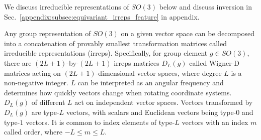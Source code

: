 We discuss irreducible representations of $SO(3)$ below and discuss inversion in Sec.~\ref{appendix:subsec:equivariant_irreps_feature} in appendix.


Any group representation of $SO(3)$ on a given vector space can be decomposed into a concatenation of provably smallest transformation matrices called irreducible representations (irreps).
Specifically, for group element $g \in SO(3)$, there are $(2L+1)$-by-$(2L+1)$ irreps matrices $D_{L}(g)$ called Wigner-D matrices acting on $(2L+1)$-dimensional vector spaces, where degree $L$ is a non-negative integer.
$L$ can be interpreted as an angular frequency and determines how quickly vectors change when rotating coordinate systems.
$D_{L}(g)$ of different $L$ act on independent vector spaces.
Vectors transformed by $D_{L}(g)$ are type-$L$ vectors, with scalars and Euclidean vectors being type-$0$ and type-$1$ vectors.
It is common to index elements of type-$L$ vectors with an index $m$ called order, where $-L \leq m \leq L$.


